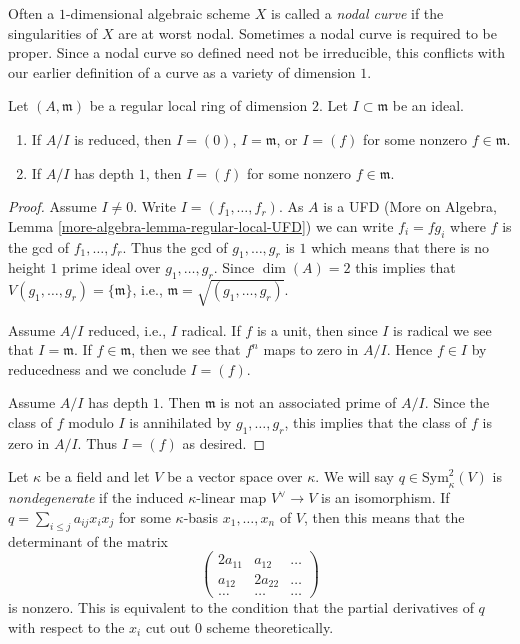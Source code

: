 \noindent
Often a $1$-dimensional algebraic scheme $X$ is called a {\it nodal curve}
if the singularities of $X$ are at worst nodal. Sometimes a nodal curve
is required to be proper. Since a nodal curve
so defined need not be irreducible, this conflicts with our earlier definition
of a curve as a variety of dimension $1$.

\begin{lemma}
\label{lemma-reduced-quotient-regular-ring-dim-2}
Let $(A, \mathfrak m)$ be a regular local ring of dimension $2$.
Let $I \subset \mathfrak m$ be an ideal.
\begin{enumerate}
\item If $A/I$ is reduced, then $I = (0)$, $I = \mathfrak m$, or
$I = (f)$ for some nonzero $f \in \mathfrak m$.
\item If $A/I$ has depth $1$, then $I = (f)$ for some nonzero
$f \in \mathfrak m$. 
\end{enumerate}
\end{lemma}

\begin{proof}
Assume $I \not = 0$. Write $I = (f_1, \ldots, f_r)$. As $A$ is a UFD
(More on Algebra, Lemma \ref{more-algebra-lemma-regular-local-UFD})
we can write $f_i = fg_i$ where $f$ is the gcd of $f_1, \ldots, f_r$.
Thus the gcd of $g_1, \ldots, g_r$ is $1$ which means that
there is no height $1$ prime ideal over $g_1, \ldots, g_r$.
Since $\dim(A) = 2$ this implies that
$V(g_1, \ldots, g_r) = \{\mathfrak m\}$, i.e.,
$\mathfrak m = \sqrt{(g_1, \ldots, g_r)}$.

\medskip\noindent
Assume $A/I$ reduced, i.e., $I$ radical. If $f$ is a unit, then since $I$
is radical we see that $I = \mathfrak m$. If $f \in \mathfrak m$, then we
see that $f^n$ maps to zero in $A/I$. Hence $f \in I$ by reducedness and
we conclude $I = (f)$.

\medskip\noindent
Assume $A/I$ has depth $1$. Then $\mathfrak m$ is not an associated
prime of $A/I$. Since the class of $f$ modulo $I$ is annihilated
by $g_1, \ldots, g_r$, this implies that the class of $f$ is zero
in $A/I$. Thus $I = (f)$ as desired.
\end{proof}

\noindent
Let $\kappa$ be a field and let $V$ be a vector space over $\kappa$.
We will say $q \in \text{Sym}^2_\kappa(V)$ is {\it nondegenerate}
if the induced $\kappa$-linear map $V^\vee \to V$ is an
isomorphism. If $q = \sum_{i \leq j} a_{ij} x_i x_j$ for some
$\kappa$-basis $x_1, \ldots, x_n$ of $V$, then this means that
the determinant of the matrix
$$
\left(
\begin{matrix}
2a_{11} & a_{12} & \ldots \\
a_{12} & 2a_{22} & \ldots \\
\ldots & \ldots & \ldots
\end{matrix}
\right)
$$
is nonzero. This is equivalent to the condition that the
partial derivatives of $q$ with respect to the $x_i$ cut out
$0$ scheme theoretically.

